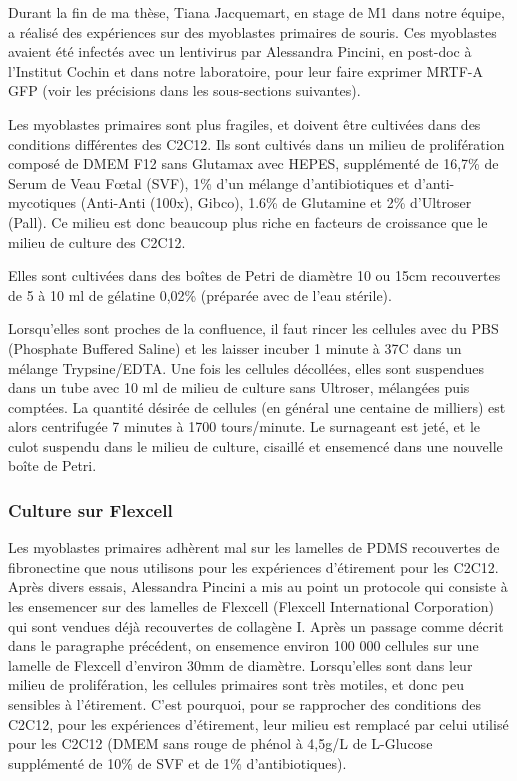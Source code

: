 	Durant la fin de ma thèse, Tiana Jacquemart, en stage de M1 dans notre équipe, a réalisé des expériences sur des myoblastes primaires de souris. Ces myoblastes avaient été infectés avec un lentivirus par Alessandra Pincini, en post-doc à l'Institut Cochin et dans notre laboratoire, pour leur faire exprimer MRTF-A GFP (voir les précisions dans les sous-sections suivantes). 
	
	Les myoblastes primaires sont plus fragiles, et doivent être cultivées dans des conditions différentes des C2C12. Ils sont cultivés dans un milieu de prolifération composé de DMEM F12 sans Glutamax avec HEPES, supplémenté de 16,7\% de Serum de Veau F\oe tal (SVF), 1\% d'un mélange d'antibiotiques et d'anti-mycotiques (Anti-Anti (100x), Gibco), 1.6\% de Glutamine et 2\% d'Ultroser (Pall). Ce milieu est donc beaucoup plus riche en facteurs de croissance que le milieu de culture des C2C12. 

	
	Elles sont cultivées dans des boîtes de Petri de diamètre 10 ou 15cm recouvertes de 5 à 10 ml de gélatine 0,02\% (préparée avec de l'eau stérile).
	
	Lorsqu'elles sont proches de la confluence, il faut rincer les cellules avec du PBS (Phosphate Buffered Saline) et les laisser incuber 1 minute à 37\degres   C dans un mélange Trypsine/EDTA. Une fois les cellules décollées, elles sont suspendues dans un tube avec 10 ml de milieu de culture sans Ultroser, mélangées puis comptées. La quantité désirée de cellules (en général une centaine de milliers) est alors centrifugée 7  minutes à 1700 tours/minute. Le surnageant est jeté, et le culot suspendu dans le milieu de culture, cisaillé et ensemencé dans une nouvelle boîte de Petri. 
	
	\subsubsection{Culture sur Flexcell}
	
	Les myoblastes primaires adhèrent mal sur les lamelles de PDMS recouvertes de fibronectine que nous utilisons pour les expériences d’étirement pour les C2C12. Après divers essais, Alessandra Pincini a mis au point un protocole qui consiste à les ensemencer sur des lamelles de Flexcell (Flexcell International Corporation) qui sont vendues déjà recouvertes de collagène I. Après un passage comme décrit dans le paragraphe précédent, on ensemence environ 100 000 cellules sur une lamelle de Flexcell d’environ 30mm de diamètre. 
	Lorsqu'elles sont dans leur milieu de prolifération, les cellules primaires sont très motiles, et donc peu sensibles à l'étirement. C'est pourquoi, pour se rapprocher des conditions des C2C12, pour les expériences d’étirement, leur milieu est remplacé par celui utilisé pour les C2C12 (DMEM sans rouge de phénol à 4,5g/L de L-Glucose supplémenté de 10\% de SVF et de 1\% d'antibiotiques). 
	

